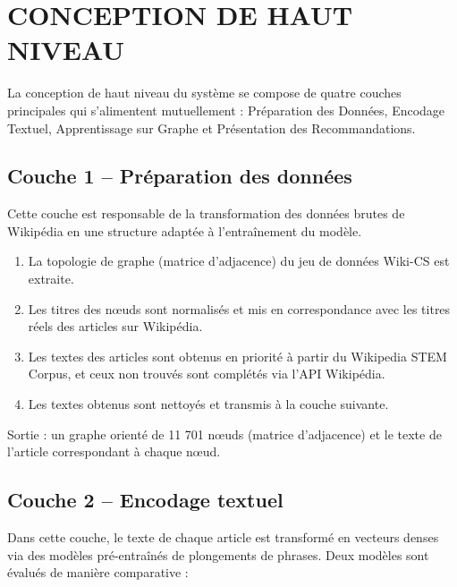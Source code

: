 \chapter{CONCEPTION DE HAUT NIVEAU}
\thispagestyle{empty}

La conception de haut niveau du système se compose de quatre couches principales qui s'alimentent mutuellement : Préparation des Données, Encodage Textuel, Apprentissage sur Graphe et Présentation des Recommandations.


\section{Couche 1 -- Préparation des données}

Cette couche est responsable de la transformation des données brutes de Wikipédia en une structure adaptée à l'entraînement du modèle.

\begin{enumerate}
    \item La topologie de graphe (matrice d'adjacence) du jeu de données Wiki-CS est extraite.
    \item Les titres des n\oe uds sont normalisés et mis en correspondance avec les titres réels des articles sur Wikipédia.
    \item Les textes des articles sont obtenus en priorité à partir du Wikipedia STEM Corpus, et ceux non trouvés sont complétés via l'API Wikipédia.
    \item Les textes obtenus sont nettoyés et transmis à la couche suivante.
\end{enumerate}

Sortie : un graphe orienté de 11 701 n\oe uds (matrice d'adjacence) et le texte de l'article correspondant à chaque n\oe ud.

\section{Couche 2 -- Encodage textuel}

Dans cette couche, le texte de chaque article est transformé en vecteurs denses via des modèles pré-entraînés de plongements de phrases. Deux modèles sont évalués de manière comparative :

